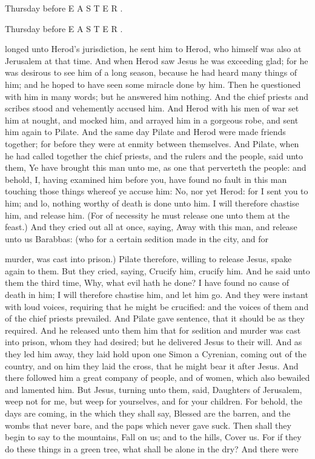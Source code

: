 Thursday before E A S T E R .

Thursday before E A S T E R .

longed unto Herod’s jurisdiction, he sent him to Herod, who himself was also at Jerusalem at that time. And when Herod saw Jesus he was exceeding glad; for he was desirous to see him of a long season, because he had heard many things of him; and he hoped to have seen some miracle done by him. Then he questioned with him in many words; but he answered him nothing. And the chief priests and scribes stood and vehemently accused him. And Herod with his men of war set him at nought, and mocked him, and arrayed him in a gorgeous robe, and sent him again to Pilate. And the same day Pilate and Herod were made friends together; for before they were at enmity between themselves. And Pilate, when he had called together the chief priests, and the rulers and the people, said unto them, Ye have brought this man unto me, as one that perverteth the people: and behold, I, having examined him before you, have found no fault in this man touching those things whereof ye accuse him: No, nor yet Herod: for I sent you to him; and lo, nothing worthy of death is done unto him. I will therefore chastise him, and release him. (For of necessity he must release one unto them at the feast.) And they cried out all at once, saying, Away with this man, and release unto us Barabbas: (who for a certain sedition made in the city, and for

murder, was cast into prison.) Pilate therefore, willing to release Jesus, spake again to them. But they cried, saying, Crucify him, crucify him. And he said unto them the third time, Why, what evil hath he done? I have found no cause of death in him; I will therefore chastise him, and let him go. And they were instant with loud voices, requiring that he might be crucified: and the voices of them and of the chief priests prevailed. And Pilate gave sentence, that it should be as they required. And he released unto them him that for sedition and murder was cast into prison, whom they had desired; but he delivered Jesus to their will. And as they led him away, they laid hold upon one Simon a Cyrenian, coming out of the country, and on him they laid the cross, that he might bear it after Jesus. And there followed him a great company of people, and of women, which also bewailed and lamented him. But Jesus, turning unto them, said, Daughters of Jerusalem, weep not for me, but weep for yourselves, and for your children. For behold, the days are coming, in the which they shall say, Blessed are the barren, and the wombs that never bare, and the paps which never gave suck. Then shall they begin to say to the mountains, Fall on us; and to the hills, Cover us. For if they do these things in a green tree, what shall be alone in the dry? And there were

